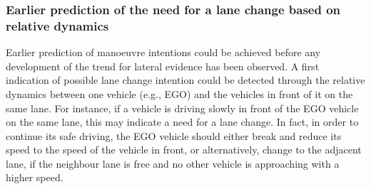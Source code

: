 
\subsubsection{Earlier prediction of the need for a lane change based on relative dynamics}

Earlier prediction of manoeuvre intentions could be achieved before any development of the trend for lateral evidence has been observed. A first indication of possible lane change intention could be detected through the relative dynamics between one vehicle (e.g., EGO) and the vehicles in front of it on the same lane. For instance, if a vehicle is driving slowly in front of the EGO vehicle on the same lane, this may indicate a need for a lane change. In fact, in order to continue its safe driving, the EGO vehicle should either break and reduce its speed to the speed of the vehicle in front, or alternatively, change to the adjacent lane, if the neighbour lane is free and no other vehicle is approaching with a higher speed. 

